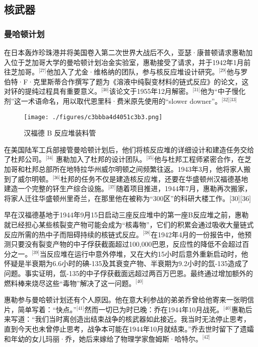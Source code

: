 \subsection{核武器}
\subsubsection{曼哈顿计划}
在日本轰炸珍珠港并将美国卷入第二次世界大战后不久，亚瑟·康普顿请求惠勒加入位于芝加哥大学的曼哈顿计划冶金实验室，惠勒接受了请求，并于1942年1月前往芝加哥。\(^\text{[27]}\)他加入了尤金·维格纳的团队，参与核反应堆设计研究。\(^\text{[29]}\)他与罗伯特·F·克里斯蒂合作撰写了题为《溶液中纯裂变材料的链式反应》的论文，这对钚的提纯过程具有重要意义。\(^\text{[30]}\)该论文于1955年12月解密。\(^\text{[31]}\)他为“中子慢化剂”这一术语命名，用以取代恩里科·费米原先使用的“slower downer”。\(^\text{[32][33]}\)
\begin{figure}[ht]
\centering
\texttt{[image: ./figures/c3bbba4d4051c3b3.png]}
\caption{汉福德 B 反应堆装料管} \label{fig_YHhl_1}
\end{figure}
在美国陆军工兵部接管曼哈顿计划后，他们将核反应堆的详细设计和建造任务交给了杜邦公司。\(^\text{[34]}\) 惠勒加入了杜邦的设计团队。\(^\text{[35]}\)他与杜邦工程师紧密合作，在芝加哥和杜邦总部所在地特拉华州威尔明顿之间频繁往返。1943年3月，他将家人搬到了威尔明顿。\(^\text{[36]}\)杜邦的任务不仅是建造核反应堆，还要在华盛顿州汉福德基地建造一个完整的钚生产综合设施。\(^\text{[37]}\)随着项目推进，1944年7月，惠勒再次搬家，将家人迁往华盛顿州里奇兰，在那里他在被称为“300区”的科研大楼工作。[30][36]

早在汉福德基地于1944年9月15日启动三座反应堆中的第一座B反应堆之前，惠勒就已经担心某些核裂变产物可能会成为“核毒物”，它们的积累会通过吸收大量链式反应所需的热中子而阻碍持续的核链式反应。\(^\text{[38]}\)在1942年4月的一份报告中，他预测只要没有裂变产物的中子俘获截面超过100,000巴恩，反应性的降低不会超过百分之一。\(^\text{[39]}\)当反应堆在运行中意外停堆，又在大约15小时后意外重新启动时，他怀疑是半衰期为6.6小时的碘-135及其衰变产物、半衰期为9.2小时的氙-135造成了问题。事实证明，氙-135的中子俘获截面远超过两百万巴恩。最终通过增加额外的燃料棒来烧尽这些“毒物”解决了这一问题。\(^\text{[40]}\)

惠勒参与曼哈顿计划还有个人原因。他在意大利参战的弟弟乔曾给他寄来一张明信片，简单写着：“快点。”\(^\text{[41]}\)然而一切已为时已晚：乔在1944年10月战死。\(^\text{[40]}\)惠勒后来写道：“我们当时离创造出结束战争的核武器如此接近。我当时无法停止思考，直到今天也未曾停止思考，战争本可能在1944年10月就结束。”乔去世时留下了遗孀和年幼的女儿玛丽·乔，她后来嫁给了物理学家詹姆斯·哈特尔。\(^\text{[42]}\)
